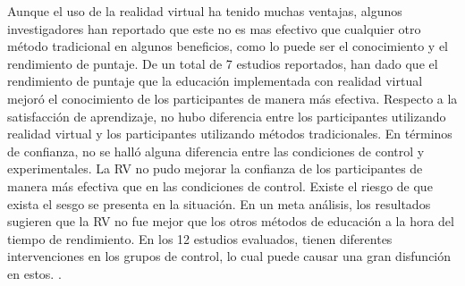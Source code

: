Aunque el uso de la realidad virtual ha tenido muchas ventajas, algunos investigadores han reportado que este no es mas efectivo que cualquier otro método tradicional en algunos beneficios, como lo puede ser el conocimiento y el rendimiento de puntaje. De un total de 7 estudios reportados, han dado que el rendimiento de puntaje que la educación implementada con realidad virtual mejoró el conocimiento de los participantes de manera más efectiva. Respecto a la satisfacción de aprendizaje, no hubo diferencia entre los participantes utilizando realidad virtual y los participantes utilizando métodos tradicionales. En términos de confianza, no se halló alguna diferencia entre las condiciones de control y experimentales. La RV no pudo mejorar la confianza de los participantes de manera más efectiva que en las condiciones de control. Existe el riesgo de que exista el sesgo se presenta en la situación. En un meta análisis, los resultados sugieren que la RV no fue mejor que los otros métodos de educación a la hora del tiempo de rendimiento. En los 12 estudios evaluados, tienen diferentes intervenciones en los grupos de control, lo cual puede causar una gran disfunción en estos. \parencite{chen2020effectiveness}.
